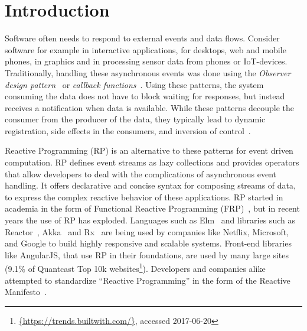 \section{Introduction}

Software often needs to respond to external events and data flows. Consider software for example in interactive applications, for desktops, web and mobile phones, in graphics and in processing sensor data from phones or IoT-devices. Traditionally, handling these asynchronous events was done using the \emph{Observer design pattern}~\cite{johnson1995design} or \emph{callback functions}~\cite{gallaba2015don}. 
Using these patterns, the system consuming the data does not have to block waiting for responses, but instead receives a notification when data is available. While these patterns decouple the consumer from the producer of the data, they typically lead to dynamic registration, side effects in the consumers, and inversion of control~\cite{salvaneschi2014empirical,edwards2009coherent}.

Reactive Programming (RP) is an alternative to these patterns for event driven computation. 
RP defines event streams as lazy collections and provides operators that allow developers to deal with the complications of asynchronous event handling.
It offers declarative and concise syntax for composing streams of data, to express the complex reactive behavior of these applications.
RP started in academia in the form of Functional Reactive Programming (FRP)~\cite{elliott1997functional,elliott2009push,czaplicki2013asynchronous,maier2010deprecating,meyerovich2009flapjax}, but in recent years the use of RP has exploded. Languages such as Elm~\cite{czaplicki2012elm} and libraries such as Reactor~\cite{Gutierrez2017}, Akka~\cite{klangakka} and Rx~\cite{meijer2010subject} are being used by companies like Netflix, Microsoft, and Google to build highly responsive and scalable systems. Front-end libraries like AngularJS, that use RP in their foundations, are used by many large sites (9.1\% 
of Quantcast Top 10k 
websites\footnote{\url{{https://trends.builtwith.com/}}, accessed 2017-06-20}). 
Developers and companies alike attempted to standardize ``Reactive Programming'' in the form of the Reactive Manifesto~\cite{boner2014reactive}.

